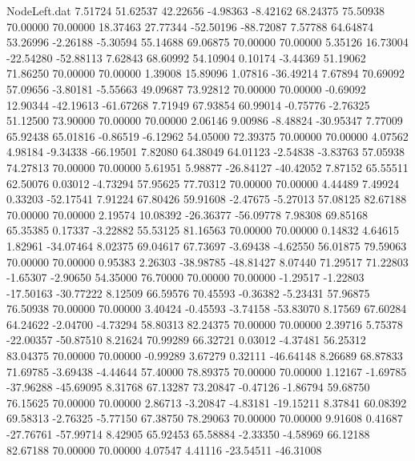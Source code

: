 \begin{filecontents}{NodeLeft.dat}
   7.51724   51.62537   42.22656    -4.98363   -8.42162   68.24375   75.50938   70.00000   70.00000   18.37463   27.77344  -52.50196  -88.72087
   7.57788   64.64874   53.26996    -2.26188   -5.30594   55.14688   69.06875   70.00000   70.00000    5.35126   16.73004  -22.54280  -52.88113
   7.62843   68.60992   54.10904     0.10174   -3.44369   51.19062   71.86250   70.00000   70.00000    1.39008   15.89096    1.07816  -36.49214
   7.67894   70.69092   57.09656    -3.80181   -5.55663   49.09687   73.92812   70.00000   70.00000   -0.69092   12.90344  -42.19613  -61.67268
   7.71949   67.93854   60.99014    -0.75776   -2.76325   51.12500   73.90000   70.00000   70.00000    2.06146    9.00986   -8.48824  -30.95347
   7.77009   65.92438   65.01816    -0.86519   -6.12962   54.05000   72.39375   70.00000   70.00000    4.07562    4.98184   -9.34338  -66.19501
   7.82080   64.38049   64.01123    -2.54838   -3.83763   57.05938   74.27813   70.00000   70.00000    5.61951    5.98877  -26.84127  -40.42052
   7.87152   65.55511   62.50076     0.03012   -4.73294   57.95625   77.70312   70.00000   70.00000    4.44489    7.49924    0.33203  -52.17541
   7.91224   67.80426   59.91608    -2.47675   -5.27013   57.08125   82.67188   70.00000   70.00000    2.19574   10.08392  -26.36377  -56.09778
   7.98308   69.85168   65.35385     0.17337   -3.22882   55.53125   81.16563   70.00000   70.00000    0.14832    4.64615    1.82961  -34.07464
   8.02375   69.04617   67.73697    -3.69438   -4.62550   56.01875   79.59063   70.00000   70.00000    0.95383    2.26303  -38.98785  -48.81427
   8.07440   71.29517   71.22803    -1.65307   -2.90650   54.35000   76.70000   70.00000   70.00000   -1.29517   -1.22803  -17.50163  -30.77222
   8.12509   66.59576   70.45593    -0.36382   -5.23431   57.96875   76.50938   70.00000   70.00000    3.40424   -0.45593   -3.74158  -53.83070
   8.17569   67.60284   64.24622    -2.04700   -4.73294   58.80313   82.24375   70.00000   70.00000    2.39716    5.75378  -22.00357  -50.87510
   8.21624   70.99289   66.32721     0.03012   -4.37481   56.25312   83.04375   70.00000   70.00000   -0.99289    3.67279    0.32111  -46.64148
   8.26689   68.87833   71.69785    -3.69438   -4.44644   57.40000   78.89375   70.00000   70.00000    1.12167   -1.69785  -37.96288  -45.69095
   8.31768   67.13287   73.20847    -0.47126   -1.86794   59.68750   76.15625   70.00000   70.00000    2.86713   -3.20847   -4.83181  -19.15211
   8.37841   60.08392   69.58313    -2.76325   -5.77150   67.38750   78.29063   70.00000   70.00000    9.91608    0.41687  -27.76761  -57.99714
   8.42905   65.92453   65.58884    -2.33350   -4.58969   66.12188   82.67188   70.00000   70.00000    4.07547    4.41116  -23.54511  -46.31008

\end{filecontents}
